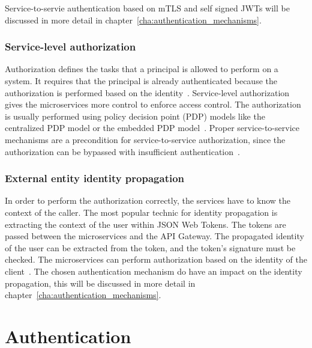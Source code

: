 Service-to-servie authentication based on mTLS and self signed JWTs will be discussed in more detail in chapter~\ref{cha:authentication_mechanisms}.

\subsubsection{Service-level authorization} 
\label{sec:service-level-authorization}
Authorization defines the tasks that a principal is allowed to perform on a system.
It requires that the principal is already authenticated because the authorization is performed based on the identity~\cite{siriwardena2014advanced}. 
Service-level authorization gives the microservices more control to enforce access control.
The authorization is usually performed using policy decision point (PDP) models like the centralized PDP model or the embedded PDP model~\cite{dias2020microservices, barabanov2020authentication}.
Proper service-to-service mechanisms are a precondition for service-to-service authorization, since the authorization can be bypassed with insufficient authentication~\cite{siriwardena2014advanced}.

\subsubsection{External entity identity propagation} 
\label{sec:external-entity-identity-propagation}
In order to perform the authorization correctly, the services have to know the context of the caller.
The most popular technic for identity propagation is extracting the context of the user within JSON Web Tokens.
The tokens are passed between the microservices and the API Gateway.
The propagated identity of the user can be extracted from the token, and the token's signature must be checked.
The microservices can perform authorization based on the identity of the client~\cite{barabanov2020authentication, dias2020microservices}.
The chosen authentication mechanism do have an impact on the identity propagation, this will be discussed in more detail in chapter~\ref{cha:authentication_mechanisms}.

\section{Authentication}



